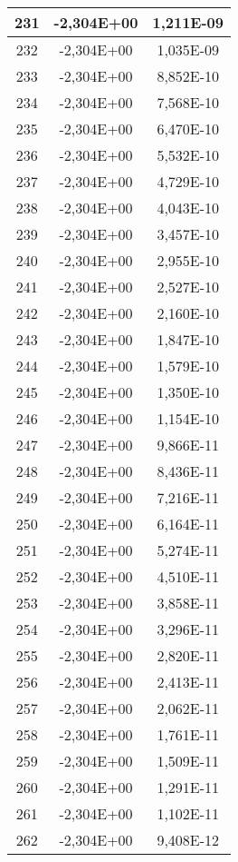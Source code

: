 \documentclass[12pt]{article}
\begin{document}
\begin{center}
\begin{longtable}{|c|c|c|}
    231	&     -2,304E+00	&   1,211E-09 \\ \hline
    232	&     -2,304E+00	&   1,035E-09 \\ \hline
    233	&     -2,304E+00	&   8,852E-10 \\ \hline
    234	&     -2,304E+00	&   7,568E-10 \\ \hline
    235	&     -2,304E+00	&   6,470E-10 \\ \hline
    236	&     -2,304E+00	&   5,532E-10 \\ \hline
    237	&     -2,304E+00	&   4,729E-10 \\ \hline
    238	&     -2,304E+00	&   4,043E-10 \\ \hline
    239	&     -2,304E+00	&   3,457E-10 \\ \hline
    240	&     -2,304E+00	&   2,955E-10 \\ \hline
    241	&     -2,304E+00	&   2,527E-10 \\ \hline
    242	&     -2,304E+00	&   2,160E-10 \\ \hline
    243	&     -2,304E+00	&   1,847E-10 \\ \hline
    244	&     -2,304E+00	&   1,579E-10 \\ \hline
    245	&     -2,304E+00	&   1,350E-10 \\ \hline
    246	&     -2,304E+00	&   1,154E-10 \\ \hline
    247	&     -2,304E+00	&   9,866E-11 \\ \hline
    248	&     -2,304E+00	&   8,436E-11 \\ \hline
    249	&     -2,304E+00	&   7,216E-11 \\ \hline
    250	&     -2,304E+00	&   6,164E-11 \\ \hline
    251	&     -2,304E+00	&   5,274E-11 \\ \hline
    252	&     -2,304E+00	&   4,510E-11 \\ \hline
    253	&     -2,304E+00	&   3,858E-11 \\ \hline
    254	&     -2,304E+00	&   3,296E-11 \\ \hline
    255	&     -2,304E+00	&   2,820E-11 \\ \hline
    256	&     -2,304E+00	&   2,413E-11 \\ \hline
    257	&     -2,304E+00	&   2,062E-11 \\ \hline
    258	&     -2,304E+00	&   1,761E-11 \\ \hline
    259	&     -2,304E+00	&   1,509E-11 \\ \hline
    260	&     -2,304E+00	&   1,291E-11 \\ \hline
    261	&     -2,304E+00	&   1,102E-11 \\ \hline
    262	&     -2,304E+00	&   9,408E-12 \\ \hline
\end{longtable}
\label{table:samples1}
\end{center}
\FloatBarrier
\end{document}
